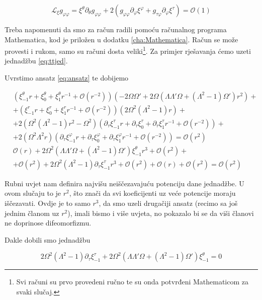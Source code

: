 \begin{equation}
\mathcal{L}_\xi g_{\varphi\varphi}=\xi^\theta\partial_{\theta}g_{\varphi\varphi}+2(g_{\varphi\varphi}\partial_{\varphi}\xi^\varphi+g_{\tau\varphi}\partial_{\varphi}\xi^\tau)=\mathcal{O}(1)
\end{equation}

\noindent Treba napomenuti da smo za račun radili pomoću računalnog programa Mathematica, kod je priložen u dodatku \ref{cha:Mathematica}. Račun se može provesti i rukom, samo su računi dosta veliki\footnote{Svi računi su prvo provedeni ručno te su onda potvrđeni Mathematicom za svaki slučaj.}. Za primjer rješavanja ćemo uzeti jednadžbu \eqref{eq:ttjed}.

\noindent Uvrstimo ansatz \eqref{eq:ansatz} te dobijemo

\begin{equation}
\begin{split}
&(\xi^\theta_{-1}r+\xi^\theta_0+\xi^\theta_1r^{-1}+\mathcal{O}(r^{-2}))(-2\Omega\Omega'+2\Omega(\Lambda\Lambda'\Omega+(\Lambda^2-1)\Omega')r^2)+\\
&+(\xi^r_{-1}r+\xi^r_0+\xi^r_1r^{-1}+\mathcal{O}(r^{-2}))(2\Omega^2(\Lambda^2-1)r)+\\
&+2(\Omega^2(\Lambda^2-1)r^2-\Omega^2)(\partial_\tau\xi^\tau_{-1}r+\partial_\tau\xi^\tau_0+\partial_\tau\xi^\tau_1r^{-1}+\mathcal{O}(r^{-2}))+\\
&+2(\Omega^2\Lambda^2r)(\partial_\tau\xi^\varphi_{-1}r+\partial_\tau\xi^\varphi_0+\partial_\tau\xi^\varphi_1r^{-1}+\mathcal{O}(r^{-2}))=\mathcal{O}(r^2)\\[1ex]
&\mathcal{O}(r)+2\Omega^2(\Lambda\Lambda'\Omega+(\Lambda^2-1)\Omega')\xi^\theta_{-1}r^3+\mathcal{O}(r^2)+\\
&+\mathcal{O}(r^2)+2\Omega^2(\Lambda^2-1)\partial_\tau\xi^\tau_{-1}r^3+\mathcal{O}(r^2)+\mathcal{O}(r)+\mathcal{O}(r^2)=\mathcal{O}(r^2)
\end{split}
\end{equation}

\noindent Rubni uvjet nam definira najvišu neiščezavajuću potenciju dane jednadžbe. U ovom slučaju to je $r^2$, što znači da svi koeficijenti uz veće potencije moraju iščezavati. Ovdje je to samo $r^3$, da smo uzeli drugačiji ansatz (recimo sa još jednim članom uz $r^2$), imali bismo i više uvjeta, no pokazalo bi se da viši članovi ne doprinose difeomorfizmu.

\noindent Dakle dobili smo jednadžbu

\begin{equation}
2\Omega^2(\Lambda^2-1)\partial_\tau\xi^\tau_{-1}+2\Omega^2(\Lambda\Lambda'\Omega+(\Lambda^2-1)\Omega')\xi^\theta_{-1}=0
\end{equation}


